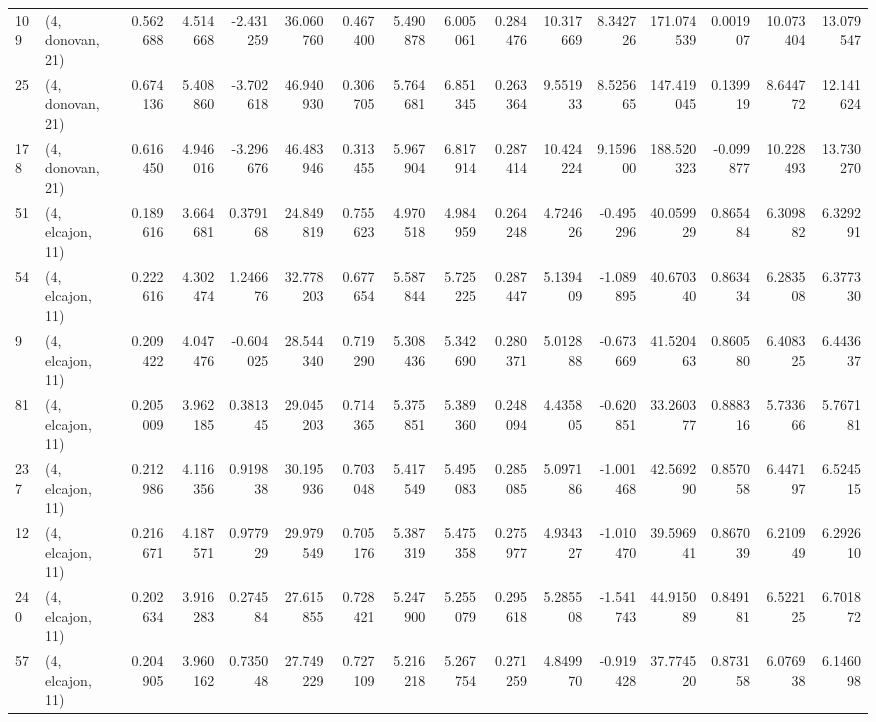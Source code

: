 \begin{tabular}{llrrrrrrrrrrrrrr}
109 &  (4, donovan, 21) &   0.562688 &   4.514668 & -2.431259 &   36.060760 &  0.467400 &   5.490878 &   6.005061 &  0.284476 &  10.317669 &   8.342726 &  171.074539 &  0.001907 &  10.073404 &  13.079547 \\
25  &  (4, donovan, 21) &   0.674136 &   5.408860 & -3.702618 &   46.940930 &  0.306705 &   5.764681 &   6.851345 &  0.263364 &   9.551933 &   8.525665 &  147.419045 &  0.139919 &   8.644772 &  12.141624 \\
178 &  (4, donovan, 21) &   0.616450 &   4.946016 & -3.296676 &   46.483946 &  0.313455 &   5.967904 &   6.817914 &  0.287414 &  10.424224 &   9.159600 &  188.520323 & -0.099877 &  10.228493 &  13.730270 \\
51  &  (4, elcajon, 11) &   0.189616 &   3.664681 &  0.379168 &   24.849819 &  0.755623 &   4.970518 &   4.984959 &  0.264248 &   4.724626 &  -0.495296 &   40.059929 &  0.865484 &   6.309882 &   6.329291 \\
54  &  (4, elcajon, 11) &   0.222616 &   4.302474 &  1.246676 &   32.778203 &  0.677654 &   5.587844 &   5.725225 &  0.287447 &   5.139409 &  -1.089895 &   40.670340 &  0.863434 &   6.283508 &   6.377330 \\
9   &  (4, elcajon, 11) &   0.209422 &   4.047476 & -0.604025 &   28.544340 &  0.719290 &   5.308436 &   5.342690 &  0.280371 &   5.012888 &  -0.673669 &   41.520463 &  0.860580 &   6.408325 &   6.443637 \\
81  &  (4, elcajon, 11) &   0.205009 &   3.962185 &  0.381345 &   29.045203 &  0.714365 &   5.375851 &   5.389360 &  0.248094 &   4.435805 &  -0.620851 &   33.260377 &  0.888316 &   5.733666 &   5.767181 \\
237 &  (4, elcajon, 11) &   0.212986 &   4.116356 &  0.919838 &   30.195936 &  0.703048 &   5.417549 &   5.495083 &  0.285085 &   5.097186 &  -1.001468 &   42.569290 &  0.857058 &   6.447197 &   6.524515 \\
12  &  (4, elcajon, 11) &   0.216671 &   4.187571 &  0.977929 &   29.979549 &  0.705176 &   5.387319 &   5.475358 &  0.275977 &   4.934327 &  -1.010470 &   39.596941 &  0.867039 &   6.210949 &   6.292610 \\
240 &  (4, elcajon, 11) &   0.202634 &   3.916283 &  0.274584 &   27.615855 &  0.728421 &   5.247900 &   5.255079 &  0.295618 &   5.285508 &  -1.541743 &   44.915089 &  0.849181 &   6.522125 &   6.701872 \\
57  &  (4, elcajon, 11) &   0.204905 &   3.960162 &  0.735048 &   27.749229 &  0.727109 &   5.216218 &   5.267754 &  0.271259 &   4.849970 &  -0.919428 &   37.774520 &  0.873158 &   6.076938 &   6.146098 \\

\end{tabular}
